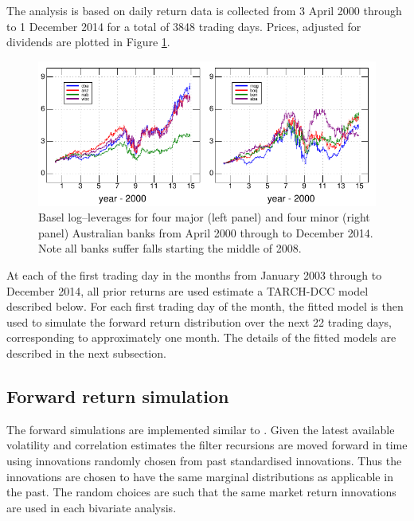 \documentclass[authoryear]{elsarticle}
\newcommand{\fref}[1]{Figure \ref{#1}}
\begin{document}
The analysis is based on daily return data is collected from   3 April 2000 through to 1 December 2014 for a total of  3848 trading days.
Prices, adjusted for dividends are plotted in \fref{prices}.

\begin{figure}[htbp]
\begin{center}
\includegraphics{prices.pdf}
\caption{Basel log--leverages for four major (left panel) and four minor (right panel) Australian banks from April 2000 through to December 2014.  Note all banks suffer  falls starting the middle of 2008.}
\label{prices}
\end{center}
\end{figure}
 
At each of the first trading day in the months from January 2003 through to December 2014,  all prior returns are used estimate a TARCH-DCC model described below.   For each first trading day of the month, the fitted model is then used to simulate the forward return distribution over the next 22 trading days, corresponding to approximately one month.  The details of the fitted models are described in the next subsection.



\subsection{Forward return simulation}

The forward simulations are implemented similar to \cite{brownlees2015}.   Given the latest available volatility and correlation estimates the filter recursions are moved forward in time using innovations randomly chosen from past standardised innovations.  Thus the innovations are chosen to have the same marginal distributions as applicable in the past.  The random choices are such  that the same market return innovations are used in each bivariate analysis.   
\end{document}
